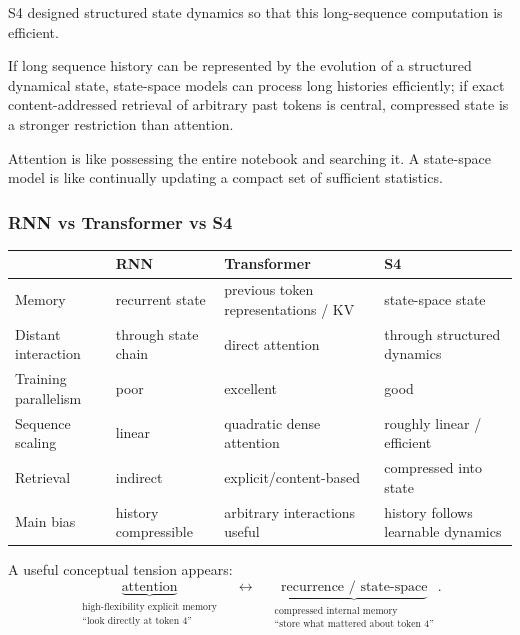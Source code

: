 S4 designed structured state dynamics so that this long-sequence computation is efficient.

\begin{calloutbias}
If long sequence history can be represented by the evolution of a structured dynamical state, state-space models can process long histories efficiently; if exact content-addressed retrieval of arbitrary past tokens is central, compressed state is a stronger restriction than attention.
\end{calloutbias}

Attention is like possessing the entire notebook and searching it.
A state-space model is like continually updating a compact set of sufficient statistics.

\subsubsection{RNN vs Transformer vs S4}
\label{subsec:modern-rnn-transformer-s4-comparison}
\begin{center}
\small
\begin{tabularx}{.98\linewidth}{@{}L{.18\linewidth}YYY@{}}
\toprule
 & \textbf{RNN} & \textbf{Transformer} & \textbf{S4} \\
\midrule
Memory & recurrent state & previous token representations / KV & state-space state \\
Distant interaction & through state chain & direct attention & through structured dynamics \\
Training parallelism & poor & excellent & good \\
Sequence scaling & linear & quadratic dense attention & roughly linear / efficient \\
Retrieval & indirect & explicit/content-based & compressed into state \\
Main bias & history compressible & arbitrary interactions useful & history follows learnable dynamics \\
\bottomrule
\end{tabularx}
\end{center}

A useful conceptual tension appears:
\[
\boxed{
\underbrace{\text{attention}}_{\substack{\text{high-flexibility explicit memory}\\\text{``look directly at token 4''}}}
\quad\longleftrightarrow\quad
\underbrace{\text{recurrence / state-space}}_{\substack{\text{compressed internal memory}\\\text{``store what mattered about token 4''}}}
}.
\]

